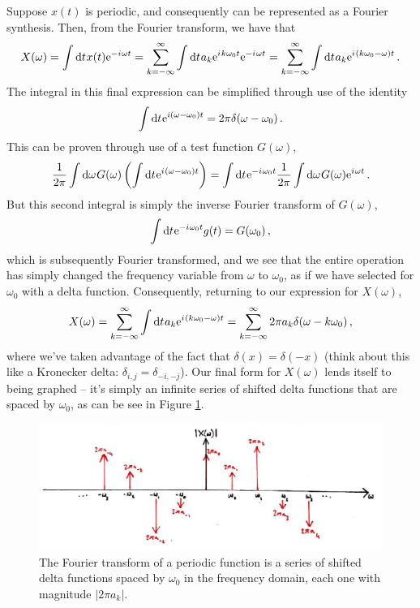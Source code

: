 Suppose $x(t)$ is periodic, and consequently can be represented as a Fourier synthesis.
Then, from the Fourier transform, we have that
%
\begin{displaymath}
  X(\omega) = \int\mathrm{d}t\mkern1mux(t)\mathrm{e}^{-{i\mkern1mu}\omega t}
  = \sum_{k=-\infty}^\infty\int\mathrm{d}t\mkern1mua_k\mathrm{e}^{{i\mkern1mu} k\omega_0 t}\mathrm{e}^{-{i\mkern1mu}\omega t}
  = \sum_{k=-\infty}^\infty \int\mathrm{d}t\mkern1mua_k\mathrm{e}^{{i\mkern1mu} (k\omega_0 - \omega) t} \,.
\end{displaymath}
%
The integral in this final expression can be simplified through use of the identity
%
\begin{displaymath}
  \int\mathrm{d}t\mkern1mu\mathrm{e}^{i(\omega - \omega_0)t} = 2\pi\delta(\omega - \omega_0) \,.
\end{displaymath}
%
This can be proven through use of a test function $G(\omega)$,
%
\begin{displaymath}
  \frac{1}{2\pi}\int\mathrm{d}\omega\mkern1mu G(\omega)\left(
    \int\mathrm{d}t\mkern1mu\mathrm{e}^{{i\mkern1mu}(\omega-\omega_0)t}
  \right)  = \int\mathrm{d}t\mkern1mu\mathrm{e}^{-{i\mkern1mu}\omega_0 t} \frac{1}{2\pi}\int\mathrm{d}\omega\mkern1mu G(\omega)\mathrm{e}^{{i\mkern1mu}\omega t} \,.
\end{displaymath}
%
But this second integral is simply the inverse Fourier transform of $G(\omega)$,
%
\begin{displaymath}
  \int\mathrm{d}t\mkern1mu\mathrm{e}^{-{i\mkern1mu}\omega_0 t} g(t) = G(\omega_0) \,,
\end{displaymath}
%
which is subsequently Fourier transformed, and we see that the entire operation
has simply changed the frequency variable from $\omega$ to $\omega_0$, as if
we have selected for $\omega_0$ with a delta function. Consequently, returning to
our expression for $X(\omega)$,
%
\begin{displaymath}
  X(\omega) = \sum_{k=-\infty}^\infty \int\mathrm{d}t\mkern1mua_k\mathrm{e}^{{i\mkern1mu} (k\omega_0 - \omega) t}
  = \sum_{k=-\infty}^\infty 2\pi a_k \delta(\omega - k\omega_0) \,,
\end{displaymath}
%
where we've taken advantage of the fact that $\delta(x) = \delta(-x)$ (think about
this like a Kronecker delta: $\delta_{i,j} = \delta_{-i,-j}$). Our final form for
$X(\omega)$ lends itself to being graphed -- it's simply an infinite series of shifted
delta functions that are spaced by $\omega_0$, as can be see in Figure
\ref{fig::lecture_5_fourier_deltas}.
%
\begin{figure}[!htb]
  \includegraphics[width=\textwidth]{images/lecture_5_fourier_deltas.JPG}
  \caption{
    The Fourier transform of a periodic function is a series of shifted
    delta functions spaced by $\omega_0$ in the frequency domain, each one
    with magnitude $|2\pi a_k|$.
  }
  \label{fig::lecture_5_fourier_deltas}
\end{figure}

